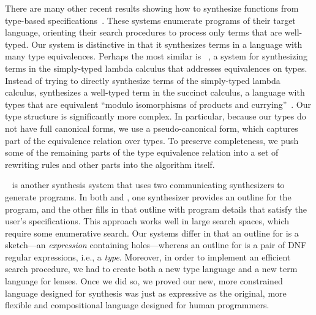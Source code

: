 \documentclass[acmsmall,screen]{acmart}
\begin{document}
There are many other recent results showing how to synthesize functions from
type-based
specifications~\cite{augustsson-2004,osera+:pldi15,feser-pldi-2015,scherer-icfp-2015,frankle+:popl16,armando+:pldi16}.
These systems enumerate programs of their target language, orienting their
search procedures to process only terms that are well-typed.
Our system is distinctive in that it synthesizes terms in a language with many
type equivalences. 
Perhaps the most similar is \InSynth{}~\cite{gvero-pldi-2013}, a system for
synthesizing terms in the simply-typed lambda calculus that addresses
equivalences on types.  Instead of trying to directly synthesize terms of the
simply-typed lambda calculus, \InSynth{} synthesizes a well-typed term
in the succinct calculus, a language with types
that are equivalent ``modulo isomorphisms of products and
currying''~\cite{gvero-pldi-2013}.
Our type structure is significantly more complex.  In particular, because our 
types do not have full canonical forms, we
use a pseudo-canonical form, which captures part of the equivalence
relation over types.  To preserve completeness, we push some of the remaining
parts of the type equivalence relation into a set of rewriting rules and
other parts into
the \RigidSynth{} algorithm itself.

\Morpheus{}~\cite{morpheus} is another synthesis system that uses two
communicating synthesizers to generate programs.  In both \Morpheus{} and
\Optician{}, one synthesizer provides an 
outline for the program, and the other fills in that outline with program
details that satisfy the user's specifications.
This approach works well in large search spaces, which
require some enumerative search.
Our systems differ in that an outline for \Morpheus{} is a sketch---an 
\emph{expression}
containing holes---whereas
an outline for \Optician{} is a pair of DNF regular
expressions, i.e., a 
\emph{type}.  Moreover, in order to implement an efficient
search procedure, we had to create both a new type language and a new
term language for lenses.  Once we did so, we proved our new, more
constrained language
designed for synthesis was just as expressive as the original, more
flexible and compositional language designed for human programmers.
\end{document}
